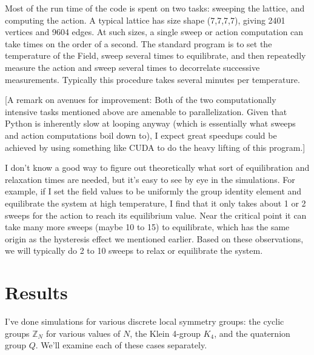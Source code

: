 \documentclass[9pt,twocolumn,twoside]{article}
\begin{document}
Most of the run time of the code is spent on two tasks: sweeping the lattice, and computing the action.  A typical lattice has size shape (7,7,7,7), giving 2401 vertices and 9604 edges.  At such sizes, a single sweep or action computation can take times on the order of a second.  The standard program is to set the temperature of the Field, sweep several times to equilibrate, and then repeatedly measure the action and sweep several times to decorrelate successive measurements.  Typically this procedure takes several minutes per temperature.

[A remark on avenues for improvement: Both of the two computationally intensive tasks mentioned above are amenable to parallelization.  Given that Python is inherently slow at looping anyway (which is essentially what sweeps and action computations boil down to), I expect great speedups could be achieved by using something like CUDA to do the heavy lifting of this program.]

I don't know a good way to figure out theoretically what sort of equilibration and relaxation times are needed, but it's easy to see by eye in the simulations.  For example, if I set the field values to be uniformly the group identity element and equilibrate the system at high temperature, I find that it only takes about 1 or 2 sweeps for the action to reach its equilibrium value.  Near the critical point it can take many more sweeps (maybe 10 to 15) to equilibrate, which has the same origin as the hysteresis effect we mentioned earlier.  Based on these observations, we will typically do 2 to 10 sweeps to relax or equilibrate the system.  

\section{Results}
I've done simulations for various discrete local symmetry groups: the cyclic groups $\mathbb{Z}_N$ for various values of $N$, the Klein 4-group $K_4$, and the quaternion group $Q$.  We'll examine each of these cases separately.
\end{document}
